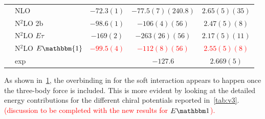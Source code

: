 \documentclass[aps,prc,twocolumn,superscriptaddress,floatfix]{revtex4-1}
\newcommand{\red}[1]{\protect\textcolor{red}{#1}}
\begin{document}
\begin{table}[htb]
\begin{tabular}{llccc}
                                               & NLO                    & $-72.3(1)$   & $-77.5(7)(240.8)$ & $2.65(5)(35)$ \\
                                               & N$^2$LO 2b             & $-98.6(1)$   & $-106(4)(56)$     & $2.47(5)(8)$  \\
   	  	                                       & N$^2$LO $E\tau$        & $-169(2)$    & $-263(26)(56)$    & $2.17(5)(11)$ \\
                                               & N$^2$LO $E\mathbbm{1}$ & \red{$-99.5(4)$} & \red{$-112(8)(56)$} & \red{$2.55(5)(8)$} \\
                                               & exp                    &              & $-127.6$          & $2.669(5)$    \\
\hline\hline
\end{tabular}
\label{tab:12}
\end{table}

As shown in~\cref{tab:12}, the overbinding in  for the soft interaction 
appears to happen once the three-body force is included. This is more evident by looking at the detailed 
energy contributions for the different chiral potentials reported in~\cref{tab:v3}.
\red{(discussion to be completed with the new results for $E\mathbbm1$).}
\end{document}
